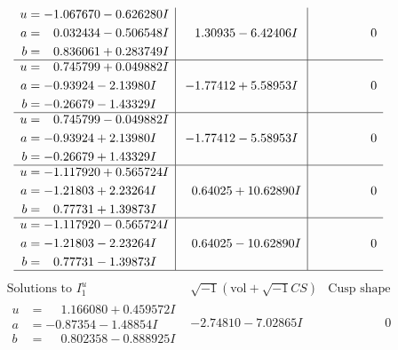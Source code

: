 \documentclass[1p]{elsarticle_modified}
\theoremstyle{definition}
\newcommand{\I}{\sqrt{-1}}
\begin{document}
$$\begin{array}{c|c|c}
\begin{aligned}
u &= -1.067670 - 0.626280 I \\
a &= \phantom{-}0.032434 - 0.506548 I \\
b &= \phantom{-}0.836061 + 0.283749 I\end{aligned}
 & \phantom{-}1.30935 - 6.42406 I & \phantom{-0.000000 } 0 \\ \hline\begin{aligned}
u &= \phantom{-}0.745799 + 0.049882 I \\
a &= -0.93924 - 2.13980 I \\
b &= -0.26679 - 1.43329 I\end{aligned}
 & -1.77412 + 5.58953 I & \phantom{-0.000000 } 0 \\ \hline\begin{aligned}
u &= \phantom{-}0.745799 - 0.049882 I \\
a &= -0.93924 + 2.13980 I \\
b &= -0.26679 + 1.43329 I\end{aligned}
 & -1.77412 - 5.58953 I & \phantom{-0.000000 } 0 \\ \hline\begin{aligned}
u &= -1.117920 + 0.565724 I \\
a &= -1.21803 + 2.23264 I \\
b &= \phantom{-}0.77731 + 1.39873 I\end{aligned}
 & \phantom{-}0.64025 + 10.62890 I & \phantom{-0.000000 } 0 \\ \hline\begin{aligned}
u &= -1.117920 - 0.565724 I \\
a &= -1.21803 - 2.23264 I \\
b &= \phantom{-}0.77731 - 1.39873 I\end{aligned}
 & \phantom{-}0.64025 - 10.62890 I & \phantom{-0.000000 } 0\\
 \hline 
 \end{array}$$\newpage$$\begin{array}{c|c|c}  
\text{Solutions to }I^u_{1}& \I (\text{vol} + \sqrt{-1}CS) & \text{Cusp shape}\\
 \hline 
\begin{aligned}
u &= \phantom{-}1.166080 + 0.459572 I \\
a &= -0.87354 - 1.48854 I \\
b &= \phantom{-}0.802358 - 0.888925 I\end{aligned}
 & -2.74810 - 7.02865 I & \phantom{-0.000000 } 0 \\ \hline\begin{aligned}

\end{aligned}
\end{array}$$
\end{document}
